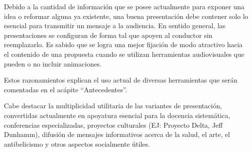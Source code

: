 
\begin{introduction}

Debido a la cantidad de información que se posee actualmente para exponer una idea o reformar alguna ya existente, una buena presentación debe contener solo lo esencial para transmitir un mensaje a la audiencia. En sentido general, las presentaciones se configuran de forma tal que apoyen al conductor sin reemplazarlo. Es sabido que se logra una mejor fijación de modo atractivo hacia el contenido de una propuesta cuando se utilizan herramientas audiovisuales que pueden o no incluir animaciones.

Estos razonamientos explican el uso actual de diversas herramientas que serán comentadas en el acápite ``Antecedentes''.

Cabe destacar la multiplicidad utilitaria de las variantes de presentación, convertidas actualmente en apoyatura esencial para la docencia sistemática, conferencias especializadas, proyectos  culturales (EJ: Proyecto Delta, Jeff Dunhamm), difusión de mensajes informativos acerca de la salud, el arte, el antibelicismo y otros aspectos socialmente útiles.






\end{introduction}
